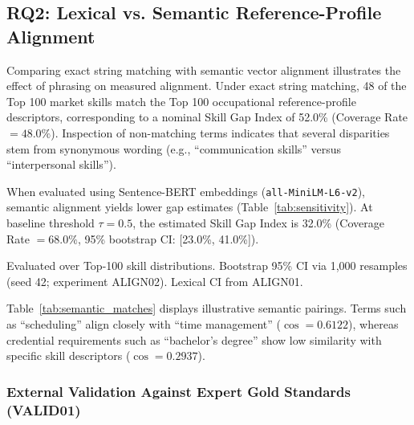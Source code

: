 \documentclass[journal]{IEEEtran}
\begin{document}
\subsection{RQ2: Lexical vs. Semantic Reference-Profile Alignment}

Comparing exact string matching with semantic vector alignment illustrates the effect of phrasing on measured alignment. Under exact string matching, 48 of the Top 100 market skills match the Top 100 occupational reference-profile descriptors, corresponding to a nominal Skill Gap Index of 52.0\% (Coverage Rate $= 48.0\%$). Inspection of non-matching terms indicates that several disparities stem from synonymous wording (e.g., ``communication skills'' versus ``interpersonal skills'').

When evaluated using Sentence-BERT embeddings (\texttt{all-MiniLM-L6-v2}), semantic alignment yields lower gap estimates (Table~\ref{tab:sensitivity}). At baseline threshold $\tau = 0.5$, the estimated Skill Gap Index is 32.0\% (Coverage Rate $= 68.0\%$, 95\% bootstrap CI: [23.0\%, 41.0\%]).

\begin{table}[!htbp]
\centering
\caption{Sensitivity Analysis: Semantic Vector Threshold ($\tau$) vs. SGI (primary corpus, $K{=}100$, $P{=}100$; here $P$ is the occupational covering-set size, not a posting sample size)}
\label{tab:sensitivity}
\resizebox{\columnwidth}{!}{%

}
\par\vspace{3pt}
{\footnotesize Evaluated over Top-100 skill distributions. Bootstrap 95\% CI via 1,000 resamples (seed 42; experiment ALIGN02). Lexical CI from ALIGN01.}
\end{table}

Table~\ref{tab:semantic_matches} displays illustrative semantic pairings. Terms such as ``scheduling'' align closely with ``time management'' ($\cos = 0.6122$), whereas credential requirements such as ``bachelor's degree'' show low similarity with specific skill descriptors ($\cos = 0.2937$).

\begin{table}[!htbp]
\centering
\caption{Representative Semantic Skill Pairings (\texttt{all-MiniLM-L6-v2})}
\label{tab:semantic_matches}
\resizebox{\columnwidth}{!}{%

}
\end{table}

\subsubsection{External Validation Against Expert Gold Standards (VALID01)}
\label{sec:valid01}
\end{document}
